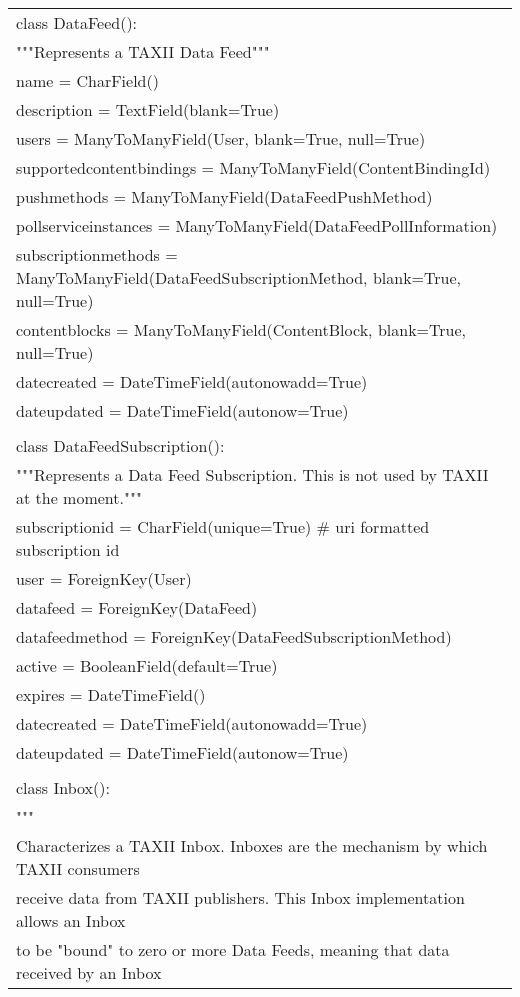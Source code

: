 \begin{center}
\begin{longtable}{|l|}
	\\
	class DataFeed():\\
	    """Represents a TAXII Data Feed"""\\
	    name = CharField()\\
	    description = TextField(blank=True)\\
	    users = ManyToManyField(User, blank=True, null=True)\\
	    supportedcontentbindings = ManyToManyField(ContentBindingId)\\
	    pushmethods = ManyToManyField(DataFeedPushMethod)\\
	    pollserviceinstances = ManyToManyField(DataFeedPollInformation)\\
	    subscriptionmethods = ManyToManyField(DataFeedSubscriptionMethod, blank=True, null=True)\\
	    contentblocks = ManyToManyField(ContentBlock, blank=True, null=True)\\
	    datecreated = DateTimeField(autonowadd=True)\\
	    dateupdated = DateTimeField(autonow=True)\\
	\\
	class DataFeedSubscription():\\
	    """Represents a Data Feed Subscription. This is not used by TAXII at the moment."""\\
	    subscriptionid = CharField(unique=True) # uri formatted subscription id\\
	    user = ForeignKey(User)\\
	    datafeed = ForeignKey(DataFeed)\\
	    datafeedmethod = ForeignKey(DataFeedSubscriptionMethod)\\
	    active = BooleanField(default=True)\\
	    expires = DateTimeField()\\
	    datecreated = DateTimeField(autonowadd=True)\\
	    dateupdated = DateTimeField(autonow=True)\\
	\\
	class Inbox():\\
	    """\\
	    Characterizes a TAXII Inbox. Inboxes are the mechanism by which TAXII consumers\\
	    receive data from TAXII publishers. This Inbox implementation allows an Inbox\\
	    to be "bound" to zero or more Data Feeds, meaning that data received by an Inbox\\

\end{longtable}
\end{center}
